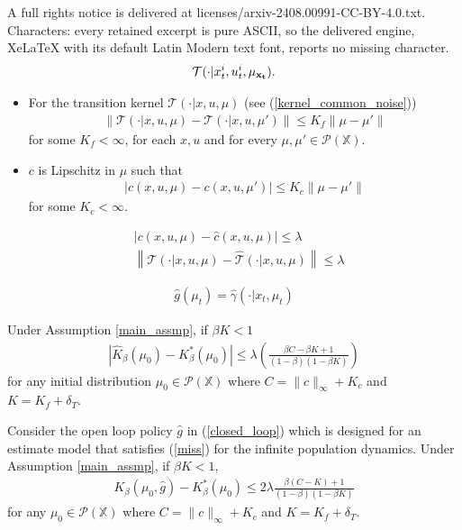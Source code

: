 \documentclass[10pt,a4paper]{amsart}
\def\P{{\mathcal P}}
\begin{document}
A full rights notice is delivered at licenses/arxiv-2408.00991-CC-BY-4.0.txt. Characters: every retained excerpt is pure ASCII, so the delivered engine, XeLaTeX with its default Latin Modern text font, reports no missing character.
\begin{align}\label{kernel_common_noise}
\mathcal{T}(\cdot|x_t^i,u_t^i,\mu_{\bf x_t}).
\end{align}

\begin{assumption}\label{main_assmp}
\begin{itemize}
\item[i.] For the transition kernel $\mathcal{T}(\cdot|x,u,\mu)$ (see (\ref{kernel_common_noise}))
\begin{align*}
\|\mathcal{T}(\cdot|x,u,\mu) - \mathcal{T}(\cdot|x,u,\mu')\| \leq K_f \|\mu-\mu'\|
\end{align*} 
for some $K_f<\infty$, for each $x,u$ and for every $\mu,\mu'\in\P(\mathds{X})$.
\item[ii] $c$ is  Lipschitz in $\mu$ such that
\begin{align*}
|c(x,u,\mu)-c(x,u,\mu')|\leq K_c \|\mu-\mu'\|
\end{align*}
for some $K_c<\infty$.
\end{itemize}
\end{assumption}

\begin{align}\label{miss}
&\left|c(x,u,\mu)-\hat{c}(x,u,\mu)\right| \leq \lambda\nonumber\\
& \left\|\mathcal{T}(\cdot|x,u,\mu) - \hat{\mathcal{T}}(\cdot|x,u,\mu) \right\| \leq \lambda
\end{align}

\begin{align}\label{closed_loop}
\hat{g}({\mu}_t) = \hat{\gamma}(\cdot|x_t,{\mu}_t)
\end{align}

\begin{lemma}\label{mod_dis}
Under Assumption \ref{main_assmp}, if $\beta K <1$
\begin{align*}
\left| \hat{K}_\beta (\mu_0) - K_\beta^*(\mu_0)\right| \leq \lambda\left( \frac{\beta C- \beta K +1}{(1-\beta)(1-\beta K)}  \right)
\end{align*}
for any initial distribution $\mu_0\in\P(\mathds{X})$ where $C=\|c\|_\infty + K_c$ and $K=K_f + \delta_T$.
\end{lemma}

\begin{theorem}
Consider the open loop policy $\hat{g}$ in (\ref{closed_loop}) which is designed for an estimate model that satisfies (\ref{miss}) for the infinite population dynamics. Under Assumption \ref{main_assmp}, if $\beta K<1$,
\begin{align*}
K_\beta(\mu_0,\hat{g}) - K_\beta^*(\mu_0) \leq  2\lambda\frac{\beta (C-K) +1}{(1-\beta)(1-\beta K)}
\end{align*}
for any $\mu_0\in\P(\mathds{X})$ where $C=\|c\|_\infty +  K_c$ and $K=K_f + \delta_T$.
\end{theorem}
\end{document}
